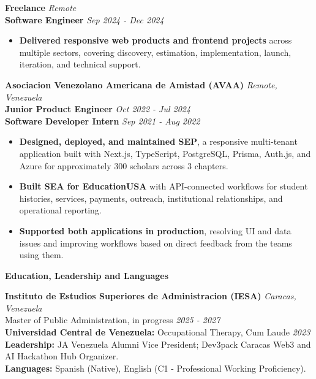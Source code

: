 \documentclass[10pt]{article}
\newcommand{\sectiontitle}[1]{%
    \vspace{3pt}
    \begin{center}
        \textbf{#1}
    \end{center}
    \vspace{-5pt}
}
\begin{document}
\vspace{1pt}
\textbf{Freelance} \hfill \textit{Remote} \\
\textbf{Software Engineer} \hfill \textit{Sep 2024 - Dec 2024}
\begin{itemize}
    \item \textbf{Delivered responsive web products and frontend projects} across multiple sectors, covering discovery, estimation, implementation, launch, iteration, and technical support.
\end{itemize}

\vspace{1pt}
\textbf{Asociacion Venezolano Americana de Amistad (AVAA)} \hfill \textit{Remote, Venezuela} \\
\textbf{Junior Product Engineer} \hfill \textit{Oct 2022 - Jul 2024} \\
\textbf{Software Developer Intern} \hfill \textit{Sep 2021 - Aug 2022}
\begin{itemize}
    \item \textbf{Designed, deployed, and maintained SEP}, a responsive multi-tenant application built with Next.js, TypeScript, PostgreSQL, Prisma, Auth.js, and Azure for approximately 300 scholars across 3 chapters.
    \item \textbf{Built SEA for EducationUSA} with API-connected workflows for student histories, services, payments, outreach, institutional relationships, and operational reporting.
    \item \textbf{Supported both applications in production}, resolving UI and data issues and improving workflows based on direct feedback from the teams using them.
\end{itemize}

\sectiontitle{Education, Leadership and Languages}
\textbf{Instituto de Estudios Superiores de Administracion (IESA)} \hfill \textit{Caracas, Venezuela} \\
Master of Public Administration, in progress \hfill \textit{2025 - 2027} \\
\textbf{Universidad Central de Venezuela:} Occupational Therapy, Cum Laude \hfill \textit{2023} \\
\textbf{Leadership:} JA Venezuela Alumni Vice President; Dev3pack Caracas Web3 and AI Hackathon Hub Organizer. \\
\textbf{Languages:} Spanish (Native), English (C1 - Professional Working Proficiency).
\end{document}
